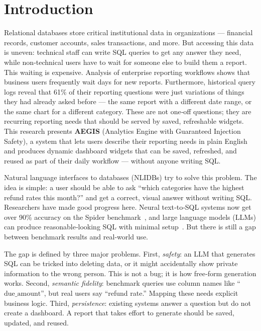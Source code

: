 \documentclass[11pt]{article}
\begin{document}
\section{Introduction}
Relational databases store critical institutional data in organizations --- financial records, customer accounts, sales transactions, and more. But accessing this data is uneven: technical staff can write SQL queries to get any answer they need, while non‑technical users have to wait for someone else to build them a report. This waiting is expensive. Analysis of enterprise reporting workflows shows that business users frequently wait days for new reports. Furthermore, historical query logs reveal that 61\% of their reporting questions were just variations of things they had already asked before --- the same report with a different date range, or the same chart for a different category. These are not one‑off questions; they are recurring reporting needs that should be served by saved, refreshable widgets. This research presents \textbf{AEGIS} (Analytics Engine with Guaranteed Injection Safety), a system that lets users describe their reporting needs in plain English and produces dynamic dashboard widgets that can be saved, refreshed, and reused as part of their daily workflow --- without anyone writing SQL.

Natural language interfaces to databases (NLIDBs) try to solve this problem. The idea is simple: a user should be able to ask ``which categories have the highest refund rates this month?'' and get a correct, visual answer without writing SQL. Researchers have made good progress here. Neural text‑to‑SQL systems now get over 90\% accuracy on the Spider benchmark~\cite{yu2018spider}, and large language models (LLMs) can produce reasonable‑looking SQL with minimal setup~\cite{li2023bigbench}. But there is still a gap between benchmark results and real‑world use.

The gap is defined by three major problems. First, \emph{safety}: an LLM that generates SQL can be tricked into deleting data, or it might accidentally show private information to the wrong person. This is not a bug; it is how free‑form generation works. Second, \emph{semantic fidelity}: benchmark queries use column names like ``$\mathrm{due\_amount}$'', but real users say ``refund rate.'' Mapping these needs explicit business logic. Third, \emph{persistence}: existing systems answer a question but do not create a dashboard. A report that takes effort to generate should be saved, updated, and reused.
\end{document}
